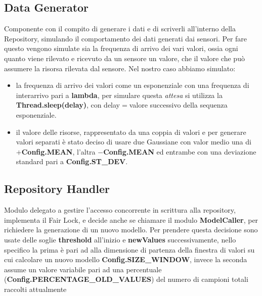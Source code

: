     \subsection{Data Generator}
      Componente con il compito di generare i dati e di scriverli all'interno della Repository, simulando il comportamento dei dati generati dai sensori. Per fare questo vengono simulate sia la frequenza di arrivo dei vari valori, ossia ogni quanto viene rilevato e ricevuto da un sensore un valore, che il valore che può assumere la risorsa rilevata dal sensore.\newline
      Nel nostro caso abbiamo simulato:
      \begin{itemize}
        \item la frequenza di arrivo dei valori come un esponenziale con una frequenza di interarrivo pari a \textbf{lambda}, per simulare questa \textit{attesa} si utilizza la \textbf{Thread.sleep(delay)}, con delay$=$valore successivo della sequenza esponenziale.
        \item il valore delle risorse, rappresentato da una coppia di valori e per generare valori separati è stato deciso di usare due Gaussiane con valor medio una di $+$\textbf{Config.MEAN}, l'altra $-$\textbf{Config.MEAN} ed entrambe con una deviazione standard pari a \textbf{Config.ST\_DEV}.
      \end{itemize}
      

    \subsection{Repository Handler}
      Modulo delegato a gestire l'accesso concorrente in scrittura alla repository, implementa il Fair Lock, e decide anche se chiamare il modulo \textbf{ModelCaller}, per richiedere la generazione di un nuovo modello. Per prendere questa decisione sono usate delle soglie \textbf{threshold} all'inizio e \textbf{newValues} successivamente, nello specifico la prima è pari ad alla dimensione di partenza della finestra di valori su cui calcolare un nuovo modello \textbf{Config.SIZE\_WINDOW}, invece la seconda assume un valore variabile pari ad una percentuale (\textbf{Config.PERCENTAGE\_OLD\_VALUES}) del numero di campioni totali raccolti attualmente
      

